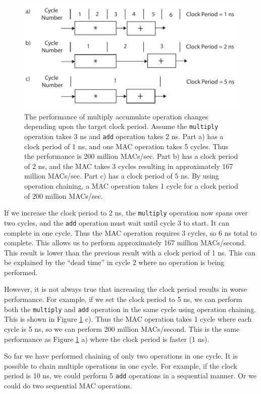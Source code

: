 \begin{figure}
\centering
\includegraphics[width=5.5in]{images/mac}
\caption{The performance of multiply accumulate operation changes depending upon the target clock period. Assume the \lstinline{multiply} operation takes 3 ns and \lstinline{add} operation takes 2 ns. Part a) has a clock period of 1 ns, and one MAC operation takes 5 cycles. Thus the performance is 200 million MACs/sec. Part b) has a clock period of 2 ns, and the MAC takes 3 cycles resulting in approximately 167 million MACs/sec.  Part c) has a clock period of 5 ns. By using operation chaining, a MAC operation takes 1 cycle for a clock period of 200 million MACs/sec. }
\label{fig:mac}
\end{figure}

If we increase the clock period to 2 ns, the \lstinline{multiply} operation now spans over two cycles, and the \lstinline{add} operation must wait until cycle 3 to start. It can complete in one cycle. Thus the MAC operation requires 3 cycles, so 6 ns total to complete. This allows us to perform approximately 167 million MACs/second. This result is lower than the previous result with a clock period of 1 ns. This can be explained by the ``dead time'' in cycle 2 where no operation is being performed.

However, it is not always true that increasing the clock period results in worse performance. For example, if we set the clock period to 5 ns, we can perform both the \lstinline{multiply} and \lstinline{add} operation in the same cycle using operation chaining. This is shown in Figure \ref{fig:mac} c). Thus the MAC operation takes 1 cycle where each cycle is 5 ns, so we can perform 200 million MACs/second. This is the same performance as Figure \ref{fig:mac} a) where the clock period is faster (1 ns). 

So far we have performed chaining of only two operations in one cycle. It is possible to chain multiple operations in one cycle. For example, if the clock period is 10 ns, we could perform 5 \lstinline{add} operations in a sequential manner. Or we could do two sequential MAC operations. 

